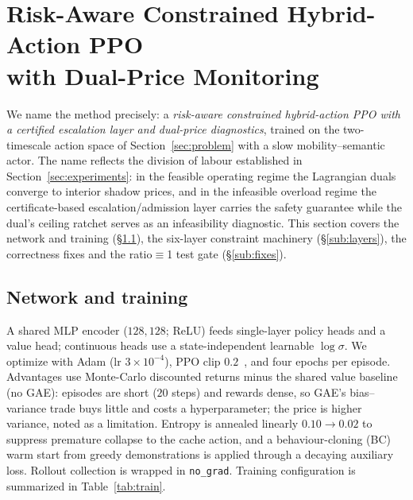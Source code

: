 \section{Risk-Aware Constrained Hybrid-Action PPO\\ with Dual-Price Monitoring}
\label{sec:algorithm}

We name the method precisely: a \emph{risk-aware constrained hybrid-action
PPO with a certified escalation layer and dual-price diagnostics}, trained
on the two-timescale action space of Section~\ref{sec:problem} with a slow
mobility--semantic actor. The name reflects the division of labour
established in Section~\ref{sec:experiments}: in the feasible operating
regime the Lagrangian duals converge to interior shadow prices, and in the
infeasible overload regime the certificate-based escalation/admission
layer carries the safety guarantee while the dual's ceiling ratchet serves
as an infeasibility diagnostic. This section covers the network and
training (§\ref{sub:net}), the six-layer constraint machinery
(§\ref{sub:layers}), the correctness fixes and the ratio$\equiv$1 test
gate (§\ref{sub:fixes}).

\subsection{Network and training}\label{sub:net}
A shared MLP encoder ($128,128$; ReLU) feeds single-layer policy heads and
a value head; continuous heads use a state-independent learnable
$\log\sigma$. We optimize with Adam (lr $3\times10^{-4}$), PPO clip
$0.2$~\cite{schulman2017ppo}, and four epochs per episode.
Advantages use Monte-Carlo discounted returns minus the shared value
baseline (no GAE): episodes are short ($20$ steps) and rewards dense, so
GAE's bias--variance trade buys little and costs a hyperparameter; the
price is higher variance, noted as a limitation. Entropy is annealed
linearly $0.10\to0.02$ to suppress premature collapse to the cache action,
and a behaviour-cloning (BC) warm start from greedy demonstrations
is applied through a decaying auxiliary loss. Rollout collection is wrapped
in \texttt{no\_grad}. Training configuration is summarized in
Table~\ref{tab:train}.

